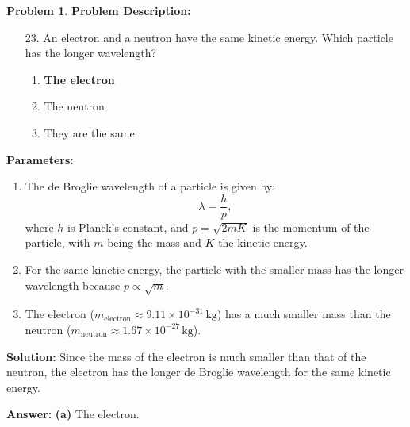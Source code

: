\documentclass[12pt]{article}
\theoremstyle{definition} %
\newtheorem{problem}{Problem}
\theoremstyle{plain} %
\begin{document}
\begin{problem}
    \textbf{Problem Description:}

\begin{enumerate}
    \item[23.] An electron and a neutron have the same kinetic energy. Which particle has the longer wavelength?
    \begin{enumerate}
        \item \textbf{The electron}
        \item The neutron
        \item They are the same
    \end{enumerate}
\end{enumerate}

\textbf{Parameters:}
\begin{enumerate}
    \item The de Broglie wavelength of a particle is given by:
    $$
    \lambda = \frac{h}{p},
    $$
    where \(h\) is Planck's constant, and \(p = \sqrt{2mK}\) is the momentum of the particle, with \(m\) being the mass and \(K\) the kinetic energy.
    \item For the same kinetic energy, the particle with the smaller mass has the longer wavelength because \(p \propto \sqrt{m}\).
    \item The electron (\(m_{\text{electron}} \approx 9.11 \times 10^{-31} \, \text{kg}\)) has a much smaller mass than the neutron (\(m_{\text{neutron}} \approx 1.67 \times 10^{-27} \, \text{kg}\)).
\end{enumerate}

\textbf{Solution:}
Since the mass of the electron is much smaller than that of the neutron, the electron has the longer de Broglie wavelength for the same kinetic energy.

\textbf{Answer:} \textbf{(a)} The electron.

\end{problem}
\end{document}
